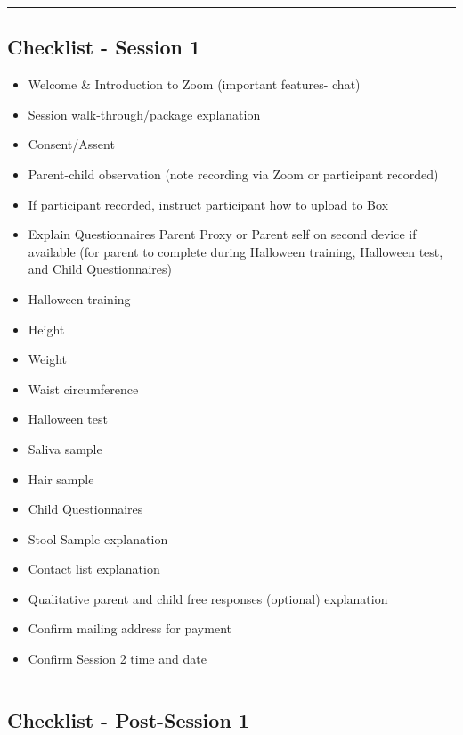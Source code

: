 \documentclass[]{book}
\providecommand{\tightlist}{%
  \setlength{\itemsep}{0pt}\setlength{\parskip}{0pt}}
\begin{document}
\begin{center}\rule{0.5\linewidth}{0.5pt}\end{center}

\hypertarget{checklist---session-1}{%
\subsection{Checklist - Session 1}\label{checklist---session-1}}

\begin{itemize}
\tightlist
\item
  Welcome \& Introduction to Zoom (important features- chat)
\item
  Session walk-through/package explanation
\item
  Consent/Assent
\item
  Parent-child observation (note recording via Zoom or participant recorded)
\item
  If participant recorded, instruct participant how to upload to Box
\item
  Explain Questionnaires Parent Proxy or Parent self on second device if available (for parent to complete during Halloween training, Halloween test, and Child Questionnaires)
\item
  Halloween training
\item
  Height
\item
  Weight
\item
  Waist circumference
\item
  Halloween test
\item
  Saliva sample
\item
  Hair sample
\item
  Child Questionnaires
\item
  Stool Sample explanation
\item
  Contact list explanation
\item
  Qualitative parent and child free responses (optional) explanation
\item
  Confirm mailing address for payment
\item
  Confirm Session 2 time and date
\end{itemize}

\begin{center}\rule{0.5\linewidth}{0.5pt}\end{center}

\hypertarget{checklist---post-session-1}{%
\subsection{Checklist - Post-Session 1}\label{checklist---post-session-1}}
\end{document}
